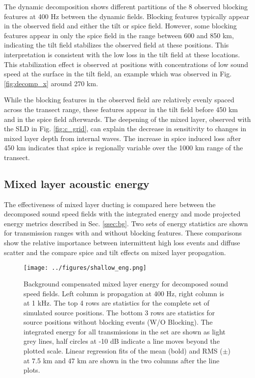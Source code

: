 \documentclass[preprint,NumberedRefs]{JASA}
\begin{document}
The dynamic decomposition shows different partitions of the 8 observed blocking features at 400 Hz between the dynamic fields. Blocking features typically appear in the observed field and either the tilt or spice field. However, some blocking features appear in only the spice field in the range between 600 and 850 km, indicating the tilt field stabilizes the observed field at these positions. This interpretation is consistent with the low loss in the tilt field at these locations. This stabilization effect is observed at positions with concentrations of low sound speed at the surface in the tilt field, an example which was observed in Fig. \ref{fig:decomp_x} around 270 km.

While the blocking features in the observed field are relatively evenly spaced across the transect range, these features appear in the tilt field before 450 km and in the spice field afterwards. The deepening of the mixed layer, observed with the SLD in Fig. \ref{fig:c_grid}, can explain the decrease in sensitivity to changes in mixed layer depth from internal waves. The increase in spice induced loss after 450 km indicates that spice is regionally variable over the 1000 km range of the transect.

\subsection{Mixed layer acoustic energy}
The effectiveness of mixed layer ducting is compared here between the decomposed sound speed fields with the integrated energy and mode projected energy metrics described in Sec. \ref{ssec:bg}. Two sets of energy statistics are shown for transmission ranges with and without blocking features. These comparisons show the relative importance between intermittent high loss events and diffuse scatter and the compare spice and tilt effects on mixed layer propagation.

\begin{figure}
\texttt{[image: ../figures/shallow\_eng.png]}
    \caption{Background compensated mixed layer energy for decomposed sound speed fields. Left column is propagation at 400 Hz, right column is at 1 kHz. The top 4 rows are statistics for the complete set of simulated source positions. The bottom 3 rows are statistics for source positions without blocking events (W/O Blocking). The integrated energy for all transmissions in the set are shown as light grey lines, half circles at -10 dB indicate a line moves beyond the plotted scale. Linear regression fits of the mean (bold) and RMS ($\pm$) at 7.5 km and 47 km are shown in the two columns after the line plots.}
    \label{fig:shal_eng}
\end{figure}
\end{document}
